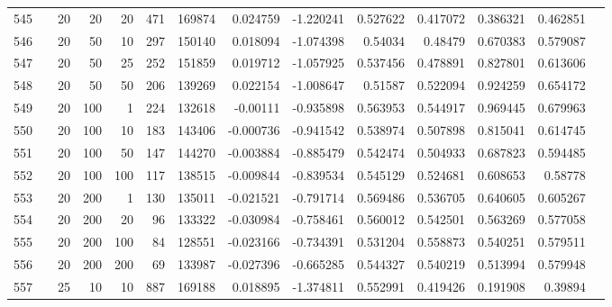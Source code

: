 \begin{longtable}{llrrrrrrrrrrrr}
		545 & &           20 &                20 &           20 &         471 &     169874 &  0.024759 & -1.220241 &  0.527622 &    0.417072 &       0.386321 &  0.462851 \\
		546 & &           20 &                50 &           10 &         297 &     150140 &  0.018094 & -1.074398 &   0.54034 &     0.48479 &       0.670383 &  0.579087 \\
		547 & &           20 &                50 &           25 &         252 &     151859 &  0.019712 & -1.057925 &  0.537456 &    0.478891 &       0.827801 &  0.613606 \\
		548 & &           20 &                50 &           50 &         206 &     139269 &  0.022154 & -1.008647 &   0.51587 &    0.522094 &       0.924259 &  0.654172 \\
		549 & &           20 &               100 &            1 &         224 &     132618 &  -0.00111 & -0.935898 &  0.563953 &    0.544917 &       0.969445 &  0.679963 \\
		550 & &           20 &               100 &           10 &         183 &     143406 & -0.000736 & -0.941542 &  0.538974 &    0.507898 &       0.815041 &  0.614745 \\
		551 & &           20 &               100 &           50 &         147 &     144270 & -0.003884 & -0.885479 &  0.542474 &    0.504933 &       0.687823 &  0.594485 \\
		552 & &           20 &               100 &          100 &         117 &     138515 & -0.009844 & -0.839534 &  0.545129 &    0.524681 &       0.608653 &   0.58778 \\
		553 & &           20 &               200 &            1 &         130 &     135011 & -0.021521 & -0.791714 &  0.569486 &    0.536705 &       0.640605 &  0.605267 \\
		554 & &           20 &               200 &           20 &          96 &     133322 & -0.030984 & -0.758461 &  0.560012 &    0.542501 &       0.563269 &  0.577058 \\
		555 & &           20 &               200 &          100 &          84 &     128551 & -0.023166 & -0.734391 &  0.531204 &    0.558873 &       0.540251 &  0.579511 \\
		556 & &           20 &               200 &          200 &          69 &     133987 & -0.027396 & -0.665285 &  0.544327 &    0.540219 &       0.513994 &  0.579948 \\
		557 & &           25 &                10 &           10 &         887 &     169188 &  0.018895 & -1.374811 &  0.552991 &    0.419426 &       0.191908 &   0.39894 \\

\end{longtable}

